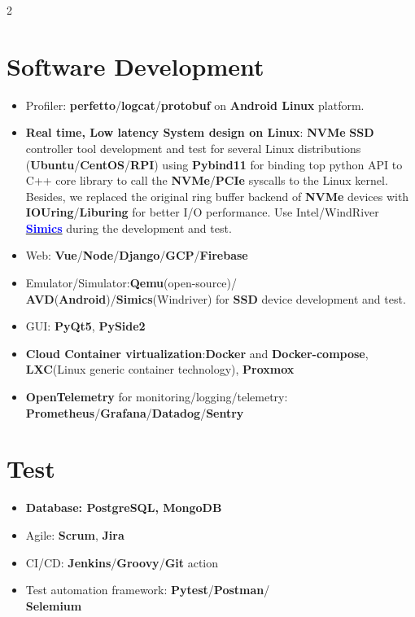 \documentclass[11pt]{article}
\begin{document}
\begin{multicols*}{2}
\vspace*{-3em}
\section*{Software Development}\label{software-dev}

\begin{itemize}[noitemsep]
    \item Profiler: \textbf{perfetto}/\textbf{logcat}/\textbf{protobuf} on \textbf{Android Linux} platform.
    \item \textbf{Real time, Low latency System design on Linux}: \textbf{NVMe} \textbf{SSD} controller tool development and test 
    for several Linux distributions (\textbf{Ubuntu}/\textbf{CentOS}/\textbf{RPI}) using \textbf{Pybind11} 
    for binding top python API to C++ core library to call the \textbf{NVMe}/\textbf{PCIe} syscalls to the Linux kernel.
    Besides, we replaced the original ring buffer backend of  \textbf{NVMe} devices with \textbf{IOUring}/\textbf{Liburing} 
    for better I/O performance. Use Intel/WindRiver \href{https://www.windriver.com/products/simics}{\textbf{\textcolor{blue}{Simics}}} during the development and test.
    \item Web: \textbf{Vue}/\textbf{Node}/\textbf{Django}/\textbf{GCP}/\textbf{Firebase}
    \item Emulator/Simulator:\textbf{Qemu}(open-source)/\\\textbf{AVD}(\textbf{Android})/\textbf{Simics}(Windriver) for \textbf{SSD} device development and test.
    \item GUI: \textbf{PyQt5}, \textbf{PySide2}
    \item \textbf{Cloud Container virtualization}:\textbf{Docker} and \textbf{Docker-compose}, \textbf{LXC}(Linux generic container technology), \textbf{Proxmox}
    \item \textbf{OpenTelemetry} for monitoring/logging/telemetry:\\ \textbf{Prometheus}/\textbf{Grafana}/\textbf{Datadog}/\textbf{Sentry}
\end{itemize}

\vspace*{-3em}
\section*{Test}
\begin{itemize}[noitemsep]
    \item \textbf{Database: PostgreSQL, MongoDB}
    \item Agile: \textbf{Scrum}, \textbf{Jira}
    \item CI/CD: \textbf{Jenkins}/\textbf{Groovy}/\textbf{Git} action
    \item Test automation framework: \textbf{Pytest}/\textbf{Postman}/\\\textbf{Selemium}
\end{itemize}


\end{multicols*}
\end{document}
